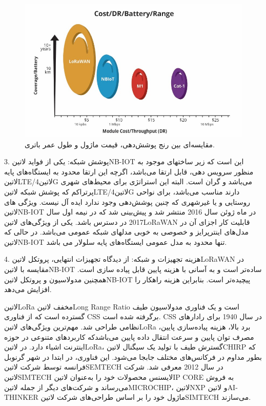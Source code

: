 \begin{figure}[!h]
	\includegraphics[width=\linewidth]{Assets/lorarange.png}
	\caption{مقایسه‌ای بین رنج پوشش‌دهی، قیمت ماژول و طول عمر باتری.}
	\label{fig:lorarange}
\end{figure}

3. پوشش شبکه: یکی از فواید ‌لاتین{NB-IOT} این است که زیر ساختهای موجود به منظور سرویس دهی، قابل ارتقا می‌باشد، اگرچه این ارتقا محدود به ایستگاه‌های پایه ‌لاتین{LTE}/‌لاتین{4G} می‌باشد و گران است. البته این استراتژی برای محیط‌های شهری پرتراکم که پوشش شبکه ‌لاتین{LTE}/‌لاتین{4G} دارند مناسب می‌باشد، برای نواحی روستایی و یا غیرشهری که چنین پوشش‌دهی وجود ندارد ایده آل نیست. ویژگی های ‌لاتین{NB-IOT} در ماه ژوئن سال 2016 منتشر شد و پیش‌بینی شد که در نیمه اول سال 2017 در دسترس باشد. یکی از ویژگی‌های ‌لاتین{LoRaWAN} قابلیت کار اجزای آن در مدل‌های اینترپرایز و خصوصی به خوبی مدلهای شبکه عمومی می‌باشد. در حالی که ‌لاتین{NB-IOT} تنها محدود به مدل عمومی ایستگاه‌های پایه سلولار می باشد.

4. هزینه تجهیزات و شبکه: از دیدگاه تجهیزات انتهایی، پروتکل ‌لاتین{LoRaWAN} در مقایسه با ‌لاتین{NB-IOT} ساده‌تر است و به آسانی با هزینه پایین قابل پیاده سازی است. همچنین مدولاسیون و پروتکل ‌لاتین{NB-IOT} پیچیده‌تر است. بنابراین هزینه راهکار را افزایش می‌دهد.

‌لاتین{LoRa} مخفف ‌لاتین{Long Range Ratio} است و یک فناوری مدولاسیون طیف گسترده است که از فناوری CSS برگرفته شده است. CSS در سال 1940 برای رادارهای نظامی طراحی شد. مهم‌ترین ویژگی‌های ‌لاتین{LoRa} برد بالا، هزینه پیاده‌سازی پایین، مصرف توان پایین و سرعت انتقال داده پایین می‌باشدکه کاربرد‌های متنوعی در حوزه اینترنت اشیاء دارد. در ‌لاتین{LoRa}، گسترش طیف با تولید یک سیگنال ‌لاتین{CHIRP} که بطور مداوم در فرکانس‌های مختلف جابجا می‌شود. این فناوری، در ابتدا در شهر گرنوبل فرانسه توسط شرکت ‌لاتین{SEMTECH} در سال 2012 معرفی شد. شرکت ‌لاتین{SIMTECH} لایسنس محصولات خود را به‌عنوان ‌لاتین{IP CORE} به فروش می‌رساند و شرکت‌های دیگر از جمله ‌لاتین{MICROCHIP}، ‌لاتین{NXP} و ‌لاتین{AI-THINKER} ماژول خود را بر اساس طراحی‌های شرکت ‌لاتین{SIMTECH} می‌سازند.

